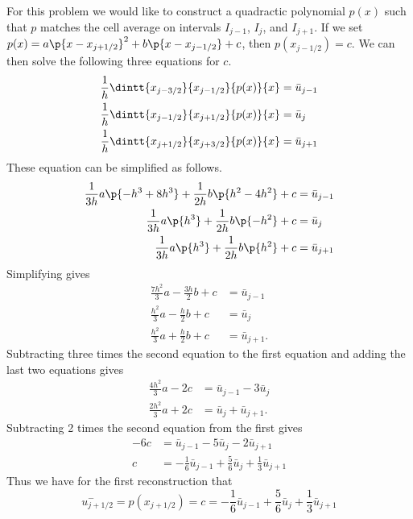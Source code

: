 \documentclass[11pt, oneside]{article}
\begin{document}
\begin{enumerate}
    For this problem we would like to construct a quadractic polynomial $p(x)$
    such that $p$ matches the cell average on intervals $I_{j-1}$, $I_j$, and
    $I_{j+1}$.
    If we set
    $p(x) = a\p{x - x_{j+1/2}}^2 + b\p{x - x_{j-1/2}} + c$, then
    $p(x_{j-1/2}) = c$.
    We can then solve the following three equations for $c$.
    \begin{align*}
      \frac{1}{h} \dintt{x_{j-3/2}}{x_{j-1/2}}{p(x)}{x} &= \bar{u}_{j-1} \\
      \frac{1}{h} \dintt{x_{j-1/2}}{x_{j+1/2}}{p(x)}{x} &= \bar{u}_{j} \\
      \frac{1}{h} \dintt{x_{j+1/2}}{x_{j+3/2}}{p(x)}{x} &= \bar{u}_{j+1}
    \end{align*}
    These equation can be simplified as follows.
    \begin{align*}
      \frac{1}{3h}a \p{-h^3 + 8h^3} + \frac{1}{2h}b\p{h^2 - 4h^2} + c &= \bar{u}_{j-1} \\
      \frac{1}{3h}a \p{h^3} + \frac{1}{2h}b\p{-h^2} + c &= \bar{u}_{j} \\
      \frac{1}{3h}a \p{h^3} + \frac{1}{2h}b\p{h^2} + c &= \bar{u}_{j+1}
    \end{align*}
    Simplifying gives
    \begin{align*}
      \frac{7h^2}{3}a - \frac{3h}{2}b + c &= \bar{u}_{j-1} \\
      \frac{h^2}{3}a - \frac{h}{2}b + c &= \bar{u}_{j} \\
      \frac{h^2}{3}a + \frac{h}{2}b + c &= \bar{u}_{j+1}.
    \end{align*}
    Subtracting three times the second equation to the first equation and adding the last two equations gives
    \begin{align*}
      \frac{4h^2}{3}a - 2c &= \bar{u}_{j-1} - 3\bar{u}_j \\
      \frac{2h^2}{3}a + 2c &= \bar{u}_j + \bar{u}_{j+1}.
    \end{align*}
    Subtracting 2 times the second equation from the first gives
    \begin{align*}
      -6c &= \bar{u}_{j-1} - 5\bar{u}_j - 2\bar{u}_{j+1} \\
      c &= -\frac{1}{6}\bar{u}_{j-1} + \frac{5}{6}\bar{u}_j + \frac{1}{3}\bar{u}_{j+1}
    \end{align*}
    Thus we have for the first reconstruction that
    \[
      u^-_{j+1/2} = p(x_{j+1/2}) = c = -\frac{1}{6}\bar{u}_{j-1} + \frac{5}{6}\bar{u}_j + \frac{1}{3}\bar{u}_{j+1}
    \]


\end{enumerate}
\end{document}
